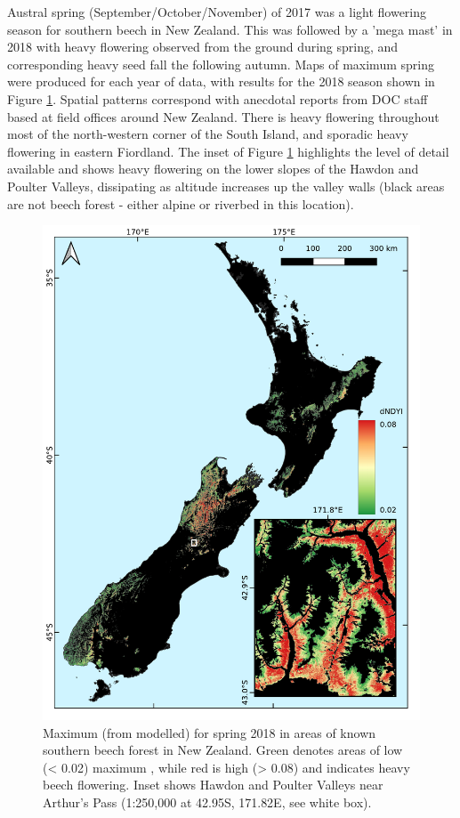 \documentclass[remotesensing,article,submit,moreauthors,pdftex]{Definitions/mdpi}
\begin{document}
Austral spring (September/October/November) of 2017 was a light flowering season for southern beech in New Zealand. This was followed by a 'mega mast' in 2018 with heavy flowering observed from the ground during spring, and corresponding heavy seed fall the following autumn. Maps of maximum spring \dndyi{} were produced for each year of data, with results for the 2018 season shown in Figure \ref{fig:ndyinz}. Spatial patterns correspond with anecdotal reports from DOC staff based at field offices around New Zealand. There is heavy flowering throughout most of the north-western corner of the South Island, and sporadic heavy flowering in eastern Fiordland. The inset of Figure \ref{fig:ndyinz} highlights the level of detail available and shows heavy flowering on the lower slopes of the Hawdon and Poulter Valleys, dissipating as altitude increases up the valley walls (black areas are not beech forest - either alpine or riverbed in this location).

\begin{figure}
    \centering
    \includegraphics[width=\textwidth]{images/figure3_2018_dndyi.pdf}
    \caption{Maximum \dndyi{} (from modelled) for spring 2018 in areas of known southern beech forest in New Zealand. Green denotes areas of low (< 0.02) maximum \dndyi{}, while red is high (> 0.08) and indicates heavy beech flowering. Inset shows Hawdon and Poulter Valleys near Arthur's Pass (1:250,000 at 42.95\degree{}S, 171.82\degree{}E, see white box).}
    \label{fig:ndyinz}
\end{figure}  
\end{document}
